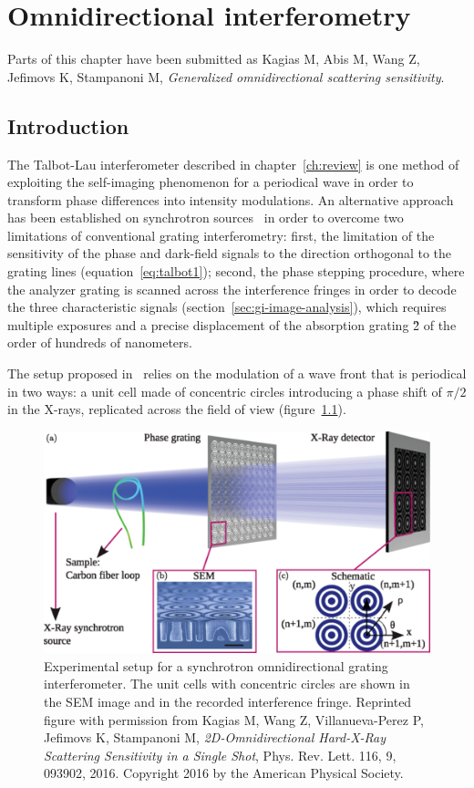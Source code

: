 \chapter{Omnidirectional interferometry}\label{ch:omnidirectional}
Parts of this chapter have been submitted as Kagias M, Abis M, Wang Z,
Jefimovs K, Stampanoni M,
\emph{Generalized omnidirectional scattering sensitivity}.

\section{Introduction}
The Talbot-Lau interferometer described in chapter~\ref{ch:review} is one
method of exploiting the self-imaging phenomenon for a periodical wave in
order to transform phase differences into intensity modulations.
An alternative approach has been established on synchrotron
sources~\parencite{PhysRevLett.116.093902} in order to overcome two limitations
of conventional grating interferometry: first, the limitation of the sensitivity of
the phase and dark-field signals to the direction orthogonal to the grating
lines (equation~\ref{eq:talbot1}); second, the phase stepping procedure, where
the analyzer grating is scanned across the interference fringes in order to
decode the three characteristic signals
(section~\ref{sec:gi-image-analysis}), which requires multiple exposures and
a precise displacement of the absorption grating \G2 of the order of
hundreds of nanometers.

The setup proposed in~\parencite{PhysRevLett.116.093902} relies on the modulation
of a wave front that is periodical in two ways: a unit cell made of
concentric circles introducing a phase shift of $\pi/2$ in the X-rays,
replicated across the field of view
(figure~\ref{fig:omnidirectional-synchrotron}).

\begin{figure}[htb]
    \centering
    \includegraphics[width=\textwidth]{gfx/omnidirectional/synchrotron-design.png}
    \caption{Experimental setup for a synchrotron omnidirectional grating
    interferometer. The unit cells with concentric circles are shown in the
    \ac{SEM} image and in the recorded interference fringe. Reprinted figure
with permission from Kagias M, Wang Z, Villanueva-Perez P, Jefimovs K,
Stampanoni M, \emph{2D-Omnidirectional Hard-X-Ray Scattering Sensitivity in
a Single Shot}, Phys. Rev. Lett. 116, 9, 093902, 2016. Copyright 2016 by the
American Physical Society.}
    \label{fig:omnidirectional-synchrotron}
\end{figure}

